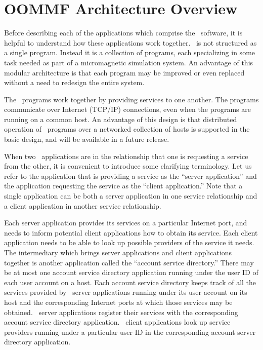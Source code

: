 
\section{OOMMF Architecture Overview}\label{sec:arch}

Before describing each of the applications which comprise
the \OOMMF\ software, it is helpful to understand how these
applications work together.  \OOMMF\ is not structured as
a single program.  Instead it is a collection of programs,
each specializing in some task needed as part of a
micromagnetic simulation system.  An advantage of this modular
architecture is that each program may be improved or even replaced 
without a need to redesign the entire system.

The \OOMMF\  programs work together by providing services
to one another.  
The programs communicate over Internet
(TCP/IP) connections,
even when the programs are running on a common host.  An advantage
of this design is that distributed operation of \OOMMF\ programs
over a networked collection of hosts is supported in the basic
design, and will be available in a future release.  

%
When two \OOMMF\ applications are in
the relationship that one is requesting a service from the other,
it is convenient to introduce some clarifying terminology.  Let
us refer to the application that is providing a service as
the ``server application'' and the application requesting the
service as the ``client application.''  
Note that a single application
can be both a server application in one service relationship and a 
client application in another service relationship.  

Each server application provides its services on a particular
Internet port, and needs to inform potential client applications 
how to obtain its service.  Each client application needs to be able
to look up possible providers of the service it needs.  The
intermediary which brings server applications and client applications
together is another application called the 
``account service directory.''
There may be at most one account service directory application 
running under the user ID of each user account on a host.
Each account service directory keeps track of all the services provided
by \OOMMF\ server applications running under its user account on its
host and the corresponding Internet ports at which those services
may be obtained.
\OOMMF\ server applications register their services with
the corresponding account service directory application.  \OOMMF\
client applications look up service providers running under a 
particular user ID in the corresponding account server directory 
application.  

